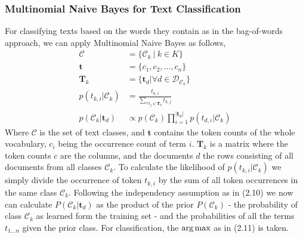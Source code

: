 \subsubsection{Multinomial Naive Bayes for Text Classification}
  For classifying texts based on the words they contain as in the bag-of-words approach, we can apply Multinomial Naive Bayes as follows,
  \begin{align}
    \mathcal{C} &= \{\mathcal{C}_k \: | \: k \in K \} \\
    \boldsymbol{t} &= \{c_1, c_2, \dots, c_n\} \\
    \boldsymbol{T}_{k} &= \{\boldsymbol{t}_d | \forall d \in \mathcal{D}_{\mathcal{C}_{k}}\} \\
    p({t_{k,i}}|\mathcal{C}_k) &= \frac{t_{k, i}}{\sum_{\forall t_j \in \boldsymbol{T}_k} t_{k, j}} \\
    p(\mathcal{C}_k|\boldsymbol{t}_d) &\propto p(\mathcal{C}_k) \prod_{i=1}^{|\boldsymbol{t}_d|}  p(t_{d,i}|\mathcal{C}_k)
  \end{align}
  Where $\mathcal{C}$ is the set of text classes, and $\boldsymbol{t}$ contains the token counts of the whole vocabulary, $c_i$ being the occurrence count of term $i$.
  $\boldsymbol{T}_k$ is a matrix where the token counts $c$ are the columns, and the documents $d$ the rows consisting of all documents from all classes $\mathcal{C}_k$.
  To calculate the likelihood of $p({t_{k,i}}|\mathcal{C}_k)$ we simply divide the occurrence of token $t_{k,i}$ by the sum of all token occurrences in the same class $\mathcal{C}_k$.
  Following the independency assumption as in (2.10) we now can calculate $P(\mathcal{C}_k | \boldsymbol{t}_d)$ as the product of the prior $P(\mathcal{C}_k)$ - the probability of class $\mathcal{C}_k$
  as learned form the training set - and the probabilities of all the terms $t_{1 \dots n}$ given the prior class.
  For classification, the $\operatorname*{arg\,max}$ as in (2.11) is taken.

